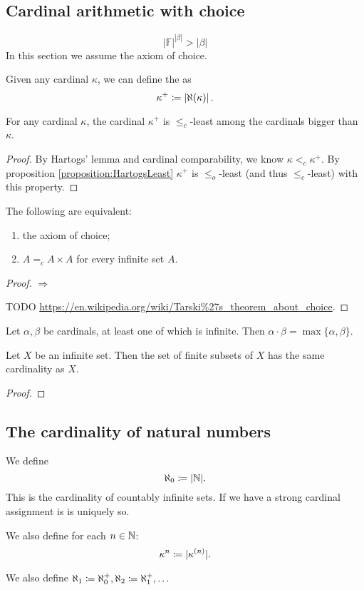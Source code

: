 \subsection{Cardinal arithmetic with choice}
\[ |\mathbb{F}|^{|\beta|} > |\beta| \]
In this section we assume the axiom of choice.
\begin{definition}
Given any cardinal $\kappa$, we can define the  as
\[ \kappa^+ \coloneqq \left|\aleph(\kappa)\right|. \]
\end{definition}

\begin{lemma}
For any cardinal $\kappa$, the cardinal $\kappa^+$ is $\leq_c$-least among the cardinals bigger than $\kappa$.
\end{lemma}
\begin{proof}
By Hartogs' lemma and cardinal comparability, we know $\kappa <_c \kappa^+$. By proposition \ref{proposition:HartogsLeast} $\kappa^+$ is $\leq_o$-least (and thus $\leq_c$-least) with this property.
\end{proof}

\begin{theorem}
The following are equivalent:
\begin{enumerate}
\item the axiom of choice;
\item $A =_c A\times A$ for every infinite set $A$.
\end{enumerate}
\end{theorem}
\begin{proof}
$\boxed{\Rightarrow}$

TODO \url{https://en.wikipedia.org/wiki/Tarski%27s_theorem_about_choice}.
\end{proof}
\begin{corollary}
Let $\alpha,\beta$ be cardinals, at least one of which is infinite. Then $\alpha \cdot \beta = \max\{\alpha, \beta\}$. 
\end{corollary}
\begin{corollary}
Let $X$ be an infinite set. Then the set of finite subsets of $X$ has the same cardinality as $X$.
\end{corollary}
\begin{proof}

\end{proof}

\subsection{The cardinality of natural numbers}
\begin{definition}
We define
\[ \aleph_0 \coloneqq |\mathbb{N}|. \]
This is the cardinality of countably infinite sets. If we have a strong cardinal assignment is is uniquely so.

We also define for each $n\in \mathbb{N}$:
\[ \kappa^n \coloneqq |\kappa^{(n)}|. \]
\end{definition}
We also define $\aleph_1 \coloneqq \aleph_0^+,\aleph_2 \coloneqq \aleph_1^+,\ldots $

